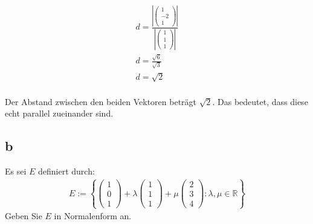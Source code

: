\begin{align*}
    d = \frac{\left|\begin{pmatrix}
                            1 \\ -2 \\ 1
                        \end{pmatrix}\right|}{\left|\begin{pmatrix}
                                                        1 \\ 1 \\ 1
                                                    \end{pmatrix}\right|}                                                   \\
    d = \frac{\sqrt{6}}{\sqrt{3}}                                                                                       \\
    d = \sqrt{2}                                                                                                        \\
\end{align*}

Der Abstand zwischen den beiden Vektoren beträgt $\sqrt{2}$. Das bedeutet, dass
diese echt parallel zueinander sind.

\subsection{b}

Es sei $E$ definiert durch:
\begin{align*}
    E := \left\{\begin{pmatrix}
                    1 \\ 0 \\1
                \end{pmatrix} + \lambda \begin{pmatrix}
                                            1 \\ 1 \\ 1
                                        \end{pmatrix} + \mu \begin{pmatrix}
                                                                2 \\ 3 \\ 4
                                                            \end{pmatrix}: \lambda, \mu \in \mathbb{R}\right\}
\end{align*}
Geben Sie $E$ in Normalenform an.

